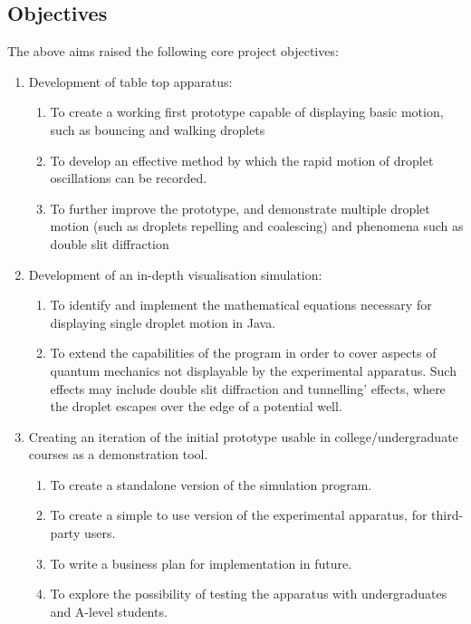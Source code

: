 \subsection{Objectives}
The above aims raised the following core project objectives: 
\begin{enumerate}
   \item Development of table top apparatus: 
   \begin{enumerate}
     \item To create a working first prototype capable of displaying basic  motion, such as bouncing and walking droplets
     \item To develop an effective method by which the rapid motion of droplet oscillations can be recorded.
     \item To further improve the prototype, and demonstrate multiple droplet motion (such as droplets repelling and coalescing) and phenomena such as double slit diffraction
    \end{enumerate}
   \item Development of an in-depth visualisation simulation:
   \begin{enumerate}
     \item To identify and implement the mathematical equations necessary for displaying single droplet motion in Java. 
     \item To extend the capabilities of the program in order to cover aspects of quantum mechanics not displayable by the experimental apparatus. Such effects may include double slit diffraction and tunnelling' effects, where the droplet escapes over the edge of a potential well. 
    \end{enumerate}
    \item Creating an iteration of the initial prototype usable in college/undergraduate courses as a demonstration tool.  
   \begin{enumerate}
     \item To create a standalone version of the simulation program.
     \item To create a simple to use version of the experimental apparatus, for third-party users. 
     \item To write a business plan for implementation in future.
     \item To explore the possibility of testing the apparatus with undergraduates and A-level students. 
    \end{enumerate}
\end{enumerate}
